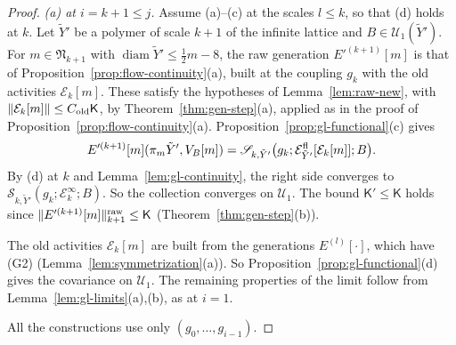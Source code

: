\begin{proof}
\emph{(a) at $i=k+1\le j$.} Assume (a)--(c) at the scales $l\le k$, so that (d) holds at $k$. Let $\tilde Y'$ be a polymer of scale $k+1$ of the infinite lattice and $B\in\mathcal U_1(\tilde Y')$. For $m\in\mathfrak N_{k+1}$ with $\operatorname{diam}\tilde Y'\le\frac12m-8$, the raw generation $E'^{(k+1)}[m]$ is that of Proposition~\ref{prop:flow-continuity}(a), built at the coupling $g_k$ with the old activities $\mathcal E_k[m]$. These satisfy the hypotheses of Lemma~\ref{lem:raw-new}, with $\|\mathcal E_k[m]\|\le C_{\rm old}\mathsf K$, by Theorem~\ref{thm:gen-step}(a), applied as in the proof of Proposition~\ref{prop:flow-continuity}(a). Proposition~\ref{prop:gl-functional}(c) gives
\[
E'^{(k+1)}[m](\pi_m\tilde Y',V_B[m])=\mathscr S_{k,\tilde Y'}\big(g_k;\mathcal E^{\rm fl}_{\tilde Y'}[\mathcal E_k[m]];B\big).
\]
By (d) at $k$ and Lemma~\ref{lem:gl-continuity}, the right side converges to $\mathscr S_{k,\tilde Y'}(g_k;\mathcal E^\infty_k;B)$. So the collection converges on $\mathcal U_1$. The bound $\mathsf K'\le\mathsf K$ holds since $\|E'^{(k+1)}[m]\|^{\rm raw}_{k+1}\le\mathsf K$ (Theorem~\ref{thm:gen-step}(b)).

The old activities $\mathcal E_k[m]$ are built from the generations $E^{(l)}[\cdot]$, which have (G2) (Lemma~\ref{lem:symmetrization}(a)). So Proposition~\ref{prop:gl-functional}(d) gives the covariance on $\mathcal U_1$. The remaining properties of the limit follow from Lemma~\ref{lem:gl-limits}(a),(b), as at $i=1$.

All the constructions use only $(g_0,\dots,g_{i-1})$.
\end{proof}

